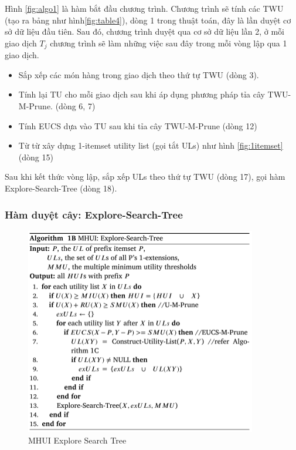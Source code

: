 Hình \ref{fig:algo1} là hàm bắt đầu chương trình. Chương trình sẽ tính các TWU (tạo ra bảng như hình\ref{fig:table4}), dòng 1 trong thuật toán, đây là lần duyệt cơ sở dữ liệu đầu tiên. Sau đó, chương trình duyệt qua cơ sở dữ liệu lần 2, ở mỗi giao dịch $T_j$ chương trình sẽ làm những việc sau đây trong mỗi vòng lập qua 1 giao dịch.

\begin{itemize}
  \item Sắp xếp các món hàng trong giao dịch theo thứ tự TWU (dòng 3). 
  \item Tính lại TU cho mỗi giao dịch sau khi áp dụng phương pháp tỉa cây TWU-M-Prune. (dòng 6, 7)
  \item Tính EUCS dựa vào TU sau khi tỉa cây TWU-M-Prune (dòng 12)
  \item Từ từ xây dựng 1-itemset utility list (gọi tắt ULs) như hình \ref{fig:1itemset} (dòng 15) 
\end{itemize}

Sau khi kết thức vòng lập, sắp xếp ULs theo thứ tự TWU (dòng 17), gọi hàm Explore-Search-Tree (dòng 18). 

\subsubsection{Hàm duyệt cây: Explore-Search-Tree }

\begin{figure}[h]
\centering
\includegraphics[width=0.9\textwidth]{image/algo/algo2.PNG}
\caption{\label{fig:algo2} MHUI Explore Search Tree}
\end{figure}

